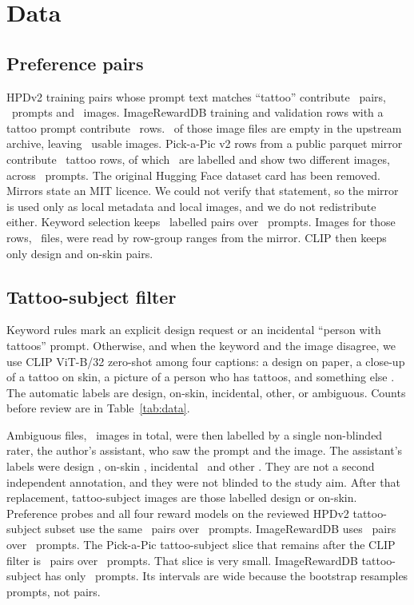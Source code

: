 \section{Data}
\label{sec:data}

\subsection{Preference pairs}
HPDv2 training pairs whose prompt text matches ``tattoo'' contribute \nHPDpairsAll\ pairs, \nHPDpromptsAll\ prompts and \nHPDimgs\ images.
ImageRewardDB training and validation rows with a tattoo prompt contribute \nIRrows\ rows.
\nIRempty\ of those image files are empty in the upstream archive, leaving \nIRimgs\ usable images.
Pick-a-Pic v2 rows from a public parquet mirror contribute \nPAProws\ tattoo rows, of which \nPAPpairs\ are labelled and show two different images, across \nPAPprompts\ prompts.
The original Hugging Face dataset card has been removed.
Mirrors state an MIT licence.
We could not verify that statement, so the mirror is used only as local metadata and local images, and we do not redistribute either.
Keyword selection keeps \nPAPkwPairs\ labelled pairs over \nPAPkwPrompts\ prompts.
Images for those rows, \nPAPimgs\ files, were read by row-group ranges from the mirror.
CLIP then keeps only design and on-skin pairs.

\subsection{Tattoo-subject filter}
Keyword rules mark an explicit design request or an incidental ``person with tattoos'' prompt.
Otherwise, and when the keyword and the image disagree, we use CLIP ViT-B/32 zero-shot among four captions: a design on paper, a close-up of a tattoo on skin, a picture of a person who has tattoos, and something else \citep{radford2021clip}.
The automatic labels are design, on-skin, incidental, other, or ambiguous.
Counts before review are in Table~\ref{tab:data}.

Ambiguous files, \nAmb\ images in total, were then labelled by a single non-blinded rater, the author's assistant, who saw the prompt and the image.
The assistant's labels were design \NambDesign, on-skin \NambOnskin, incidental \NambIncidental\ and other \NambOther.
They are not a second independent annotation, and they were not blinded to the study aim.
After that replacement, tattoo-subject images are those labelled design or on-skin.
Preference probes and all four reward models on the reviewed HPDv2 tattoo-subject subset use the same \HpdHpstwoN\ pairs over \NHpdTsprompts\ prompts.
ImageRewardDB uses \IrFractightgapfiveN\ pairs over \NIrTsprompts\ prompts.
The Pick-a-Pic tattoo-subject slice that remains after the CLIP filter is \PapHpstwoN\ pairs over \NPapTsprompts\ prompts.
That slice is very small.
ImageRewardDB tattoo-subject has only \NIrTsprompts\ prompts.
Its intervals are wide because the bootstrap resamples prompts, not pairs.

